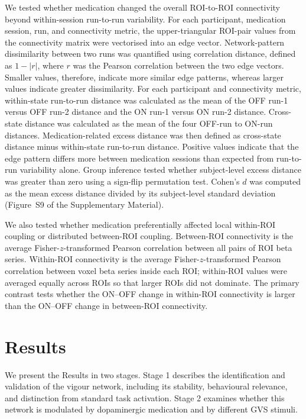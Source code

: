 \documentclass[utf8]{FrontiersinHarvard}
\begin{document}
We tested whether medication changed the overall ROI-to-ROI connectivity beyond within-session run-to-run variability. For each participant, medication session, run, and connectivity metric, the upper-triangular ROI-pair values from the connectivity matrix were vectorised into an edge vector. Network-pattern dissimilarity between two runs was quantified using correlation distance, defined as \(1-|r|\), where \(r\) was the Pearson correlation between the two edge vectors. Smaller values, therefore, indicate more similar edge patterns, whereas larger values indicate greater dissimilarity. For each participant and connectivity metric, within-state run-to-run distance was calculated as the mean of the OFF run-1 versus OFF run-2 distance and the ON run-1 versus ON run-2 distance. Cross-state distance was calculated as the mean of the four OFF-run to ON-run distances. Medication-related excess distance was then defined as cross-state distance minus within-state run-to-run distance. Positive values indicate that the edge pattern differs more between medication sessions than expected from run-to-run variability alone. Group inference tested whether subject-level excess distance was greater than zero using a sign-flip permutation test. Cohen's \(d\) was computed as the mean excess distance divided by its subject-level standard deviation (Figure~S9 of the Supplementary Material).

We also tested whether medication preferentially affected local within-ROI coupling or distributed between-ROI coupling. Between-ROI connectivity is the average Fisher-\(z\)-transformed Pearson correlation between all pairs of ROI beta series. Within-ROI connectivity is the average Fisher-\(z\)-transformed Pearson correlation between voxel beta series inside each ROI; within-ROI values were averaged equally across ROIs so that larger ROIs did not dominate. The primary contrast tests whether the ON–OFF change in within-ROI connectivity is larger than the ON–OFF change in between-ROI connectivity.



\section{Results}
We present the Results in two stages. Stage 1 describes the  identification and validation of the vigour network, including  its stability, behavioural relevance, and distinction from standard task activation. Stage 2 examines whether this network is modulated by dopaminergic medication and by different GVS stimuli.
\end{document}
